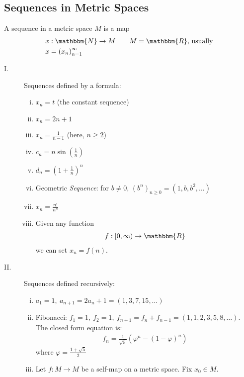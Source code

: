 \documentclass[10pt]{extarticle}
\newcommand{\N}{\mathbbm{N}}
\newcommand{\R}{\mathbbm{R}}
\begin{document}
  \subsection{Sequences in Metric Spaces}%
    A sequence in a metric space $M$ is a map
    \begin{align*}
      x&: \N \rightarrow M \tag*{$M = \R$, usually}\\
      x &= \left(x_n\right)_{n=1}^{\infty}
    \end{align*}
    \begin{description}
      \item[I.] Sequences defined by a formula:
        \begin{enumerate}[(i)]
          \item $x_n = t$ (the constant sequence)
          \item $x_n = 2n + 1$
          \item $x_n = \frac{1}{n-1}$ (here, $n \geq 2$)
          \item $c_n = n\sin\left(\frac{1}{n}\right)$
          \item $d_n = \left(1 + \frac{1}{n}\right)^n$
          \item Geometric \textsl{Sequence}: for $b\neq 0$, $(b^n)_{n\geq 0} = (1,b,b^2,\dots)$
          \item $x_n = \frac{n!}{n^n}$
          \item Given any function
            \begin{align*}
              f:[0,\infty)\rightarrow\R
            \end{align*}
            we can set $x_n = f(n)$.
        \end{enumerate}
      \item[II.] Sequences defined recursively:
        \begin{enumerate}[(i)]
          \item $a_1 = 1,~a_{n+1}=2a_n + 1 = (1,3,7,15,\dots)$
          \item Fibonacci: $f_1 = 1,~f_2 = 1,~f_{n+1} = f_{n} + f_{n-1} = (1,1,2,3,5,8,\dots)$. The closed form equation is:
            \begin{align*}
              f_n = \frac{1}{\sqrt{5}}\left(\varphi^n - (1-\varphi)^n\right)
            \end{align*}
            where $\varphi = \frac{1 + \sqrt{5}}{2}$
          \item Let $f: M\rightarrow M$ be a self-map on a metric space. Fix $x_0\in M$.\\


\end{enumerate}
\end{description}
\end{document}
